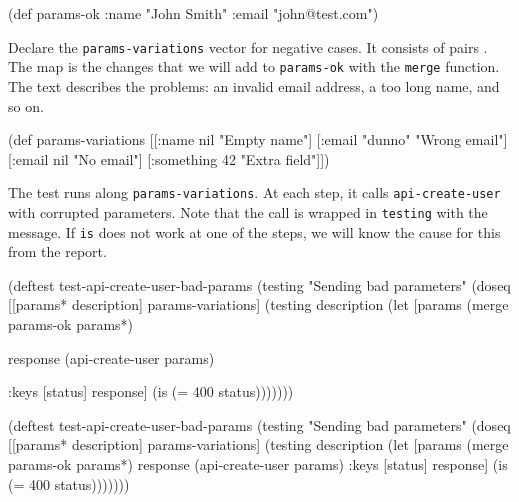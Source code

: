 \else

\begin{english}
  \begin{clojure}
(def params-ok {:name "John Smith" :email "john@test.com"})
  \end{clojure}
\end{english}

\fi

Declare the \verb|params-variations| vector for negative cases. It consists of pairs . The map is the changes that we will add to  \verb|params-ok| with the \verb|merge| function. The text describes the problems: an invalid email address, a too long name, and so on.

\begin{english}
  \begin{clojure}
(def params-variations
  [[{:name nil}      "Empty name"]
   [{:email "dunno"} "Wrong email"]
   [{:email nil}     "No email"]
   [{:something 42}  "Extra field"]])
  \end{clojure}
\end{english}

The test runs along \verb|params-variations|. At each step, it calls \verb|api-create-user| with corrupted parameters. Note that the call is wrapped in \verb|testing| with the message. If \verb|is| does not work at one of the steps, we will know the cause for this from the report.

\ifx\DEVICETYPE\MOBILE

\begin{english}
  \begin{clojure}
(deftest test-api-create-user-bad-params
  (testing "Sending bad parameters"
    (doseq [[params* description]
            params-variations]
      (testing description
        (let [params
              (merge params-ok params*)

              response
              (api-create-user params)

              {:keys [status]} response]
          (is (= 400 status)))))))
  \end{clojure}
\end{english}

\else

\begin{english}
  \begin{clojure}
(deftest test-api-create-user-bad-params
  (testing "Sending bad parameters"
    (doseq [[params* description] params-variations]
      (testing description
        (let [params (merge params-ok params*)
              response (api-create-user params)
              {:keys [status]} response]
          (is (= 400 status)))))))
  \end{clojure}
\end{english}

